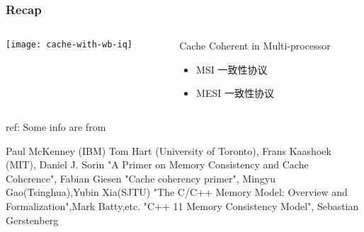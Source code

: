 %
%
\begin{frame}[plain]
	\frametitle{Recap }
	
	
	
	\begin{columns}
		
		\begin{column}{.5\textwidth}
			\centering
			
			\texttt{[image: cache-with-wb-iq]}

		\end{column}
		
		\begin{column}{.5\textwidth}
			
			\Large
            Cache Coherent in Multi-processor
			\begin{itemize}
				\item  MSI 一致性协议
				\item MESI 一致性协议
			
			\end{itemize}
			
		\end{column}
		
		
	\end{columns}
	
\tiny ref:
Some info are from

Paul McKenney (IBM) Tom Hart (University of Toronto), Frans Kaashoek (MIT), 
Daniel J. Sorin "A Primer on Memory Consistency and Cache Coherence", Fabian Giesen "Cache coherency primer", Mingyu Gao(Tsinghua),Yubin Xia(SJTU)
"The C/C++ Memory Model: Overview and Formalization",Mark Batty,etc. "C++ 11 Memory Consistency Model", Sebastian Gerstenberg 

	
\end{frame}


